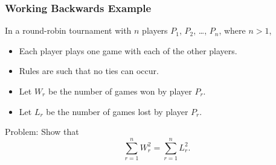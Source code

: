 \documentclass{beamer}
\begin{document}

\begin{frame}%
\frametitle{Working Backwards Example}

 In a round-robin tournament with $n$ players $P_1$, $P_2$, \ldots, $P_n$, where $n > 1$,
\begin{itemize}
\item<2-> Each player plays one game with each of the other players.
\item<3-> Rules are such that no ties can occur.
\item<4-> Let $W_r$ be the number of games won by player $P_r$.
\item<5-> Let $L_r$ be the number of games lost by player $P_r$.
\end{itemize}
\begin{mdframed}[style=exampledefault]
Problem: Show that
$$
\sum_{r = 1}^{n} W_r^2 = \sum_{r = 1}^{n} L_r^2.
$$
\end{mdframed}

\end{frame}
\end{document}
